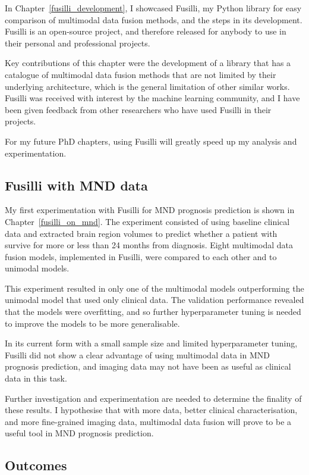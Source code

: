In Chapter~\ref{fusilli_development}, I showcased Fusilli, my Python library for easy comparison of multimodal data fusion methods, and the steps in its development.
Fusilli is an open-source project, and therefore released for anybody to use in their personal and professional projects.

Key contributions of this chapter were the development of a library that has a catalogue of multimodal data fusion methods that are not limited by their underlying architecture, which is the general limitation of other similar works.
Fusilli was received with interest by the machine learning community, and I have been given feedback from other researchers who have used Fusilli in their projects.

For my future PhD chapters, using Fusilli will greatly speed up my analysis and experimentation.

\subsection{Fusilli with MND data}

My first experimentation with Fusilli for MND prognosis prediction is shown in Chapter~\ref{fusilli_on_mnd}.
The experiment consisted of using baseline clinical data and extracted brain region volumes to predict whether a patient with survive for more or less than 24 months from diagnosis.
Eight multimodal data fusion models, implemented in Fusilli, were compared to each other and to unimodal models.

This experiment resulted in only one of the multimodal models outperforming the unimodal model that used only clinical data.
The validation performance revealed that the models were overfitting, and so further hyperparameter tuning is needed to improve the models to be more generalisable.

In its current form with a small sample size and limited hyperparameter tuning, Fusilli did not show a clear advantage of using multimodal data in MND prognosis prediction, and imaging data may not have been as useful as clinical data in this task.

Further investigation and experimentation are needed to determine the finality of these results.
I hypothesise that with more data, better clinical characterisation, and more fine-grained imaging data, multimodal data fusion will prove to be a useful tool in MND prognosis prediction.

\subsection{Outcomes}


